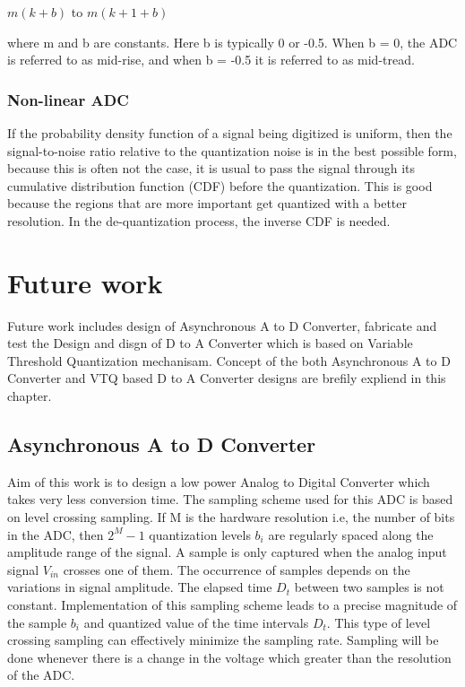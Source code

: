 \begin{center}
    $m (k + b)$ to $m (k + 1 + b)$
\end{center}

\hspace{0.5cm} where m and b are constants. Here b is typically 0 or -0.5. When b = 0, the ADC is referred to as mid-rise, and when b = -0.5 it is referred to as mid-tread.\\

\subsection{Non-linear ADC}
	
\par
\hspace{1.2cm} If the probability density function of a signal being digitized is uniform, then the signal-to-noise ratio relative to the quantization noise is in the best possible form, because this is often not the case, it is usual to pass the signal through its cumulative distribution function (CDF) before the quantization. This is good because the regions that are more important get quantized with a better resolution. In the de-quantization process, the inverse CDF is needed.\\



\chapter{Future work}

\par
\hspace{1.2cm}Future work includes design of Asynchronous A to D Converter, fabricate and test the Design and disgn of D to A Converter which is based on Variable Threshold Quantization mechanisam. Concept of the both Asynchronous A to D Converter and VTQ based D to A Converter designs are brefily expliend in this chapter.


\section{Asynchronous A to D Converter}
\par
\hspace{1.2cm} Aim of this work is to design a low power Analog to Digital Converter which takes very less conversion time. The sampling scheme used for this ADC is based on level crossing sampling. If M is the hardware resolution i.e, the number of bits in the ADC, then ${2^M}-1$ quantization levels $b_i$ are regularly spaced along the amplitude range of the signal. A sample is only captured when the analog input signal $V_{in}$ crosses one of them. The occurrence of samples depends on the variations in signal amplitude. The elapsed time $D_t$ between two samples is not constant. Implementation of this sampling scheme leads to a precise magnitude of the sample $b_i$ and quantized value of the time intervals $D_t$. This type of level crossing sampling can effectively minimize the sampling rate. Sampling will be done whenever there is a change in the voltage which greater than the resolution of the ADC.\\ 

